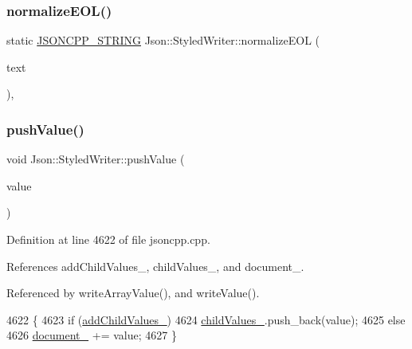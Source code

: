 \subsubsection{\texorpdfstring{normalize\+E\+O\+L()}{normalizeEOL()}}
{\footnotesize\ttfamily static \hyperlink{json_8h_a1e723f95759de062585bc4a8fd3fa4be}{J\+S\+O\+N\+C\+P\+P\+\_\+\+S\+T\+R\+I\+NG} Json\+::\+Styled\+Writer\+::normalize\+E\+OL (\begin{DoxyParamCaption}\item[{const \hyperlink{json_8h_a1e723f95759de062585bc4a8fd3fa4be}{J\+S\+O\+N\+C\+P\+P\+\_\+\+S\+T\+R\+I\+NG} \&}]{text }\end{DoxyParamCaption})\hspace{0.3cm}{\ttfamily [static]}, {\ttfamily [private]}}

\mbox{\label{class_json_1_1_styled_writer_a236a833b4bdaa09915c2cac715970f08}} 
\subsubsection{\texorpdfstring{push\+Value()}{pushValue()}}
{\footnotesize\ttfamily void Json\+::\+Styled\+Writer\+::push\+Value (\begin{DoxyParamCaption}\item[{const \hyperlink{json_8h_a1e723f95759de062585bc4a8fd3fa4be}{J\+S\+O\+N\+C\+P\+P\+\_\+\+S\+T\+R\+I\+NG} \&}]{value }\end{DoxyParamCaption})\hspace{0.3cm}{\ttfamily [private]}}



Definition at line 4622 of file jsoncpp.\+cpp.



References add\+Child\+Values\+\_\+, child\+Values\+\_\+, and document\+\_\+.



Referenced by write\+Array\+Value(), and write\+Value().


\begin{DoxyCode}
4622                                                         \{
4623   \textcolor{keywordflow}{if} (\hyperlink{class_json_1_1_styled_writer_acaabfa48b50a8bb7fa9ce98e2ae971d9}{addChildValues\_})
4624     \hyperlink{class_json_1_1_styled_writer_a1f905495f0705365af117ec541e29fdf}{childValues\_}.push\_back(value);
4625   \textcolor{keywordflow}{else}
4626     \hyperlink{class_json_1_1_styled_writer_ae967b0c77e4d7cb889ce7b6ee4ce28d7}{document\_} += value;
4627 \}
\end{DoxyCode}
\mbox{\label{class_json_1_1_styled_writer_acee1c9285519b573cfcb00b7e7f5a809}} 
